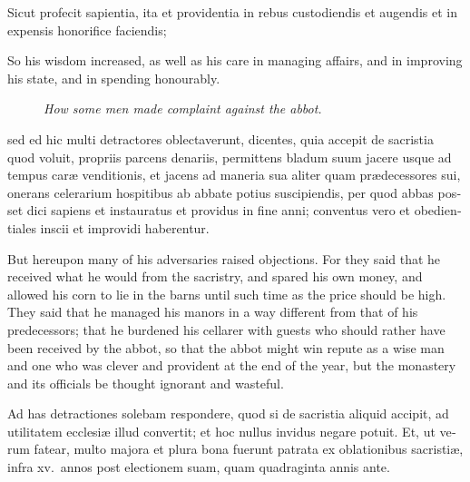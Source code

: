 \documentclass[10pt]{book}
\newcommand{\blockhead}[4][]{
\begin{figure}
\centering
\vspace{#4}
\parbox{2.75cm}{\begin{center}\footnotesize \color{BrickRed} \emph{#2}\\ #1 \end{center}}
\end{figure}
}
\begin{document}
\begin{paracol}{2}
\switchcolumn*

\begin{otherlanguage}{latin}
Sicut profecit sapientia, ita et providentia in rebus custodiendis et augendis et in expensis honorifice faciendis;
\end{otherlanguage}

\switchcolumn

So his wisdom increased, as well as his care in managing affairs, and in improving his state, and in spending honourably.

\switchcolumn*

\begin{otherlanguage}{latin}
\blockhead{How some men made complaint against the abbot.}{4}{-0.45cm}
sed ed hic multi detractores oblectaverunt, dicentes, quia accepit de sacristia quod voluit, propriis parcens denariis, permittens bladum suum jacere usque ad tempus car\ae{} venditionis, et jacens ad maneria sua aliter quam pr\ae{}decessores sui, onerans celerarium hospitibus ab abbate potius suscipiendis, per quod abbas posset dici sapiens et instauratus et providus in fine anni; conventus vero et obedientiales inscii et improvidi haberentur.

\end{otherlanguage}

\switchcolumn

But hereupon many of his adversaries raised objections. For they said that he received what he would from the sacristry, and spared his own money, and allowed his corn to lie in the barns until such time as the price should be high. They said that he managed his manors in a way different from that of his predecessors; that he burdened his cellarer with guests who should rather have been received by the abbot, so that the abbot might win repute as a wise man and one who was clever and provident at the end of the year, but the monastery and its officials be thought ignorant and wasteful.

\switchcolumn*

\begin{otherlanguage}{latin}
Ad has detractiones solebam respondere, quod si de sacristia aliquid accipit, ad utilitatem ecclesi\ae{} illud convertit; et hoc nullus invidus negare potuit. Et, ut verum fatear, multo majora et plura bona fuerunt patrata ex oblationibus sacristi\ae{}, infra xv.\ annos post electionem suam, quam quadraginta annis ante.
\end{otherlanguage}

\switchcolumn


\end{paracol}
\end{document}
